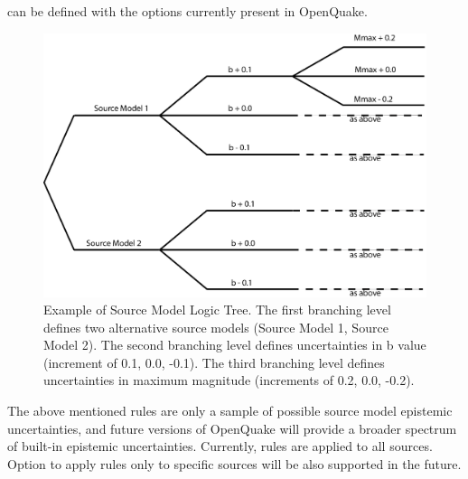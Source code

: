 can be defined with the options currently present in OpenQuake.
%
\begin{figure}
\includegraphics[width=15cm]{./Figures/Part_Hazard/SourceModelLogicTree.eps}
\caption{Example of Source Model Logic Tree. The first branching level defines
two alternative source models (Source Model 1, Source Model 2). The second 
branching level defines uncertainties in b value (increment of 0.1, 0.0, -0.1).
The third branching level defines uncertainties in maximum magnitude 
(increments of 0.2, 0.0, -0.2).}
\label{fig:SourceModelLogicTree}
\end{figure}
%
The above mentioned rules are only a sample of possible source model epistemic 
uncertainties, and future versions of OpenQuake will provide a broader spectrum
of built-in epistemic uncertainties. Currently, rules are applied to all 
sources. Option to apply rules only to specific sources will be also supported 
in the future.
%
